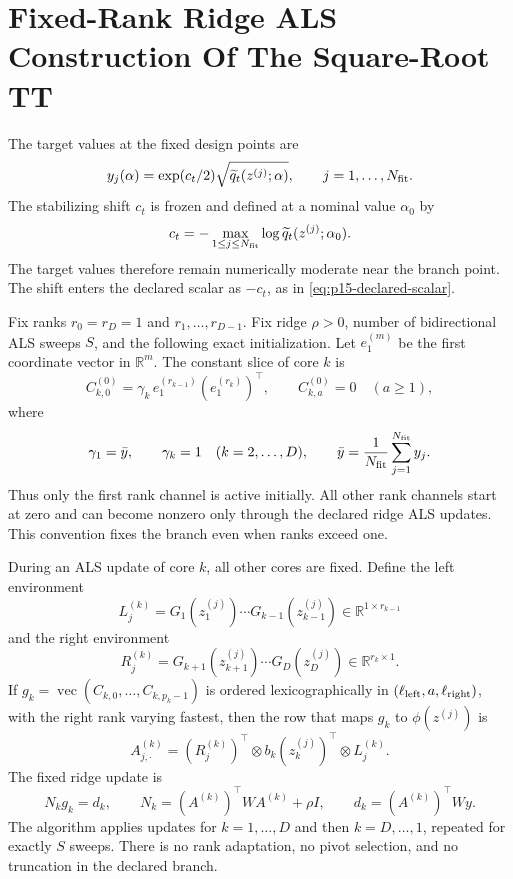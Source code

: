 \documentclass[11pt]{article}
\newcommand{\R}{\mathbb{R}}
\newcommand{\vecop}{\operatorname{vec}}
\theoremstyle{definition}
\theoremstyle{remark}
\renewcommand{\[}{\begin{equation}}
\renewcommand{\]}{\end{equation}}
\begin{document}
\section{Fixed-Rank Ridge ALS Construction Of The Square-Root TT}

The target values at the fixed design points are
\[
  y_j(\alpha)
  =
  \exp(c_t/2)\sqrt{\widetilde q_t(z^{(j)};\alpha)},
  \qquad j=1,\ldots,N_{\rm fit}.
  \label{eq:p15-target-y}
\]
The stabilizing shift \(c_t\) is frozen and defined at a nominal value
\(\alpha_0\) by
\[
  c_t=-\max_{1\le j\le N_{\rm fit}}\log \widetilde q_t(z^{(j)};\alpha_0).
  \label{eq:p15-shift}
\]
The target values therefore remain numerically moderate near the branch point.
The shift enters the declared scalar as \(-c_t\), as in
\eqref{eq:p15-declared-scalar}.

Fix ranks \(r_0=r_D=1\) and \(r_1,\ldots,r_{D-1}\).  Fix ridge
\(\rho>0\), number of bidirectional ALS sweeps \(S\), and the following exact
initialization.  Let \(e^{(m)}_1\) be the first coordinate vector in
\(\R^m\).  The constant slice of core \(k\) is
\[
  C_{k,0}^{(0)}
  =
  \gamma_k\, e^{(r_{k-1})}_1 (e^{(r_k)}_1)^\top,
  \qquad
  C_{k,a}^{(0)}=0\quad(a\ge1),
  \label{eq:p15-initialization}
\]
where
\[
  \gamma_1=\bar y,\qquad
  \gamma_k=1\quad(k=2,\ldots,D),\qquad
  \bar y=\frac1{N_{\rm fit}}\sum_{j=1}^{N_{\rm fit}}y_j.
  \label{eq:p15-ybar}
\]
Thus only the first rank channel is active initially.  All other rank channels
start at zero and can become nonzero only through the declared ridge ALS
updates.  This convention fixes the branch even when ranks exceed one.

During an ALS update of core \(k\), all other cores are fixed.  Define the left
environment
\[
  L_j^{(k)}=G_1(z_1^{(j)})\cdots G_{k-1}(z_{k-1}^{(j)})
  \in\R^{1\times r_{k-1}}
  \label{eq:p15-left-env}
\]
and the right environment
\[
  R_j^{(k)}=G_{k+1}(z_{k+1}^{(j)})\cdots G_D(z_D^{(j)})
  \in\R^{r_k\times1}.
  \label{eq:p15-right-env}
\]
If \(g_k=\vecop(C_{k,0},\ldots,C_{k,p_k-1})\) is ordered
lexicographically in \((\ell_{\rm left},a,\ell_{\rm right})\), with the right
rank varying fastest, then the row that maps \(g_k\) to \(\phi(z^{(j)})\) is
\[
  A_{j,\cdot}^{(k)}
  =
  (R_j^{(k)})^\top\otimes
  b_k(z_k^{(j)})^\top\otimes
  L_j^{(k)}.
  \label{eq:p15-als-row}
\]
The fixed ridge update is
\[
  N_k g_k=d_k,\qquad
  N_k=(A^{(k)})^\top W A^{(k)}+\rho I,\qquad
  d_k=(A^{(k)})^\top W y.
  \label{eq:p15-ridge-normal}
\]
The algorithm applies updates for \(k=1,\ldots,D\) and then
\(k=D,\ldots,1\), repeated for exactly \(S\) sweeps.  There is no rank
adaptation, no pivot selection, and no truncation in the declared branch.
\end{document}
